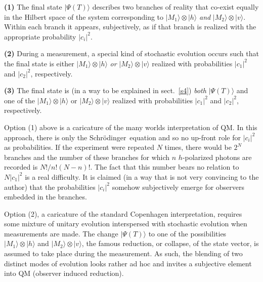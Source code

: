 \documentclass[12pt]{article}
\theoremstyle{plain}
\theoremstyle{definition}
\theoremstyle{remark}
\def\SCH{Schr\"odinger\ }
\def\ket#1{| #1\rangle}
\begin{document}
\vspace{0.5cm}
{\bf (1)} The final state $\ket{\Psi(T)}$ describes two branches of reality that co-exist equally in the Hilbert space of the system corresponding to $\ket{M_1}\otimes\ket{h}$ {\it and\/} $\ket{M_2}\otimes\ket{v}$. Within each branch it appears, subjectively, as if that branch is realized with the appropriate probability $|c_i|^2$.

{\bf (2)} During a measurement, a special kind of stochastic evolution occurs such that the final state is either $\ket{M_1}\otimes\ket{h}$ {\it or\/} $\ket{M_2}\otimes\ket{v}$ realized with probabilities $|c_1|^2$ and $|c_2|^2$, respectively.

{\bf(3)} The final state is (in a way to be explained in sect.~\ref{s4}) {\it both\/} $\ket{\Psi(T)}$ and one of the $\ket{M_1}\otimes\ket{h}$ or $\ket{M_2}\otimes\ket{v}$ realized with probabilities $|c_1|^2$ and $|c_2|^2$, respectively.

\vspace{0.5cm}
Option (1) above is a caricature of the many worlds interpretation of QM. 
In this approach, there is only the \SCH equation and so no up-front role for $|c_i|^2$ as probabilities. If the experiment were repeated $N$ times, there would be $2^N$ branches and the number of these branches for which $n$ $h$-polarized photons are recorded is $N!/n!(N-n)!$. The fact that this number bears no relation to $N|c_1|^2$ is a real difficulty.
It is claimed  \cite{Wallace} (in a way that is not very convincing to the author) that the probabilities $|c_i|^2$ somehow subjectively emerge for observers embedded in the branches. 

Option (2), a caricature of the standard Copenhagen interpretation, requires some mixture of unitary evolution interspersed with stochastic evolution when measurements are made. The change $\ket{\Psi(T)}$ to one of the possibilities $\ket{M_1}\otimes\ket{h}$ and $\ket{M_2}\otimes\ket{v}$, the famous reduction, or collapse, of the state vector, is assumed to take place during the measurement. As such, the blending of two distinct modes of evolution looks rather ad hoc and invites a subjective element into QM (observer induced reduction). 
\end{document}
